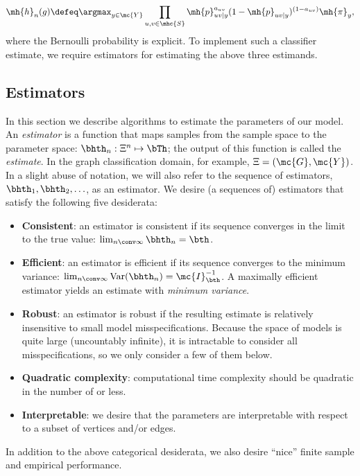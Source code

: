 \documentclass[10pt,journal,cspaper,compsoc]{IEEEtran}
\begin{document}
\begin{align}
\mh{h}_n(g) \defeq  \argmax_{y \in \mc{Y}} \prod_{u,v \in \mhc{S}}
\mh{p}_{uv|y}^{a_{uv}}(1-\mh{p}_{uv|y})^{(1-a_{uv})} \mh{\pi}_y,
\end{align}
where the Bernoulli probability is explicit. To implement such a classifier estimate, we require estimators for estimating the above three estimands.


\subsection{Estimators} %
\label{sub:estimators}


In this section we describe algorithms to estimate the parameters of our model.  An \emph{estimator} is a function that maps samples from the sample space to the parameter space: $\bhth_n: \Xi^n \mapsto \bTh$; the output of this function is called the \emph{estimate}.  In the graph classification domain, for example, $\Xi=(\mc{G},\mc{Y})$.  In a slight abuse of notation, we will also refer to the sequence of estimators, $\bhth_1,\bhth_2, \ldots$, as an estimator.  We desire (a sequences of) estimators that satisfy the following five desiderata:

\begin{itemize}
	\item \textbf{Consistent}: an estimator is consistent if its sequence converges in the limit to the true value: $\lim_{n \conv \infty} \bhth_n = \bth$.  %
	\item \textbf{Efficient}: an estimator is efficient if its sequence converges to the minimum variance: $\lim_{n\conv\infty} \text{Var}(\bhth_n) = \mc{I}_{\bth}^{-1}$.  %
	A maximally efficient estimator yields an estimate with \emph{minimum variance}.
	\item \textbf{Robust}: an estimator is robust if the resulting estimate is relatively insensitive to small model misspecifications.  Because the space of models is quite large (uncountably infinite), it is intractable to consider all misspecifications, so we only consider a few of them below. %
	\item \textbf{Quadratic complexity}: computational time complexity should be quadratic in the number of  or less.
	\item \textbf{Interpretable}: we desire that the parameters are interpretable with respect to a subset of vertices and/or edges.
\end{itemize}
In addition to the above categorical desiderata, we also desire ``nice'' finite sample and empirical performance.
\end{document}
